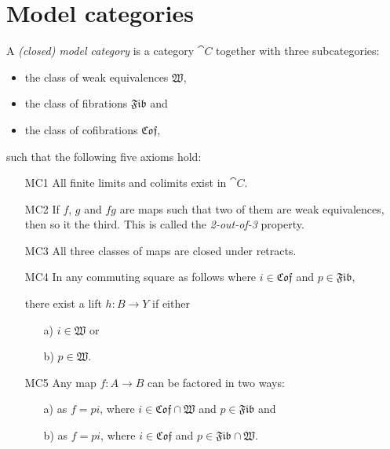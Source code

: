 
\section{Model categories}
\label{sec:model_categories}

\newcommand{\W}{\mathfrak{W}}
\newcommand{\Fib}{\mathfrak{Fib}}
\newcommand{\Cof}{\mathfrak{Cof}}

\begin{definition}
	A \emph{(closed) model category} is a category $\cat{C}$ together with three subcategories:
	\begin{itemize}
		\item the class of weak equivalences $\W$,
		\item the class of fibrations $\Fib$ and
		\item the class of cofibrations $\Cof$,
	\end{itemize}
	such that the following five axioms hold:
	\begin{itemize}
		\item[MC1] All finite limits and colimits exist in $\cat{C}$.
		\item[MC2] If $f$, $g$ and $fg$ are maps such that two of them are weak equivalences, then so it the third. This is called the \emph{2-out-of-3} property.
		\item[MC3] All three classes of maps are closed under retracts.
		\item[MC4] In any commuting square as follows where $i \in \Cof$ and $p \in \Fib$,
		\begin{center}
		\end{center}

		 there exist a lift $h: B \to Y$ if either 
		\begin{itemize}
			\item[a)] $i \in \W$ or
			\item[b)] $p \in \W$.
		\end{itemize}
		\item[MC5] Any map $f : A \to B$ can be factored in two ways:
		\begin{itemize}
			\item[a)] as $f = pi$, where $i \in \Cof \cap \W$ and $p \in \Fib$ and
			\item[b)] as $f = pi$, where $i \in \Cof$ and $p \in \Fib \cap \W$.
		\end{itemize}
	\end{itemize}
\end{definition}

